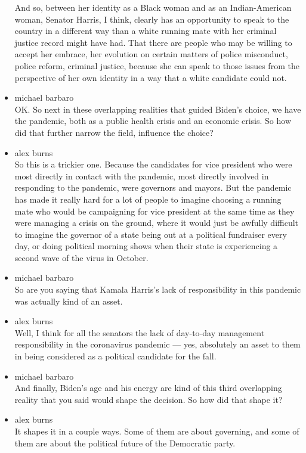 \begin{itemize}
  And so, between her identity as a Black woman and as an
  Indian-American woman, Senator Harris, I think, clearly has an
  opportunity to speak to the country in a different way than a white
  running mate with her criminal justice record might have had. That
  there are people who may be willing to accept her embrace, her
  evolution on certain matters of police misconduct, police reform,
  criminal justice, because she can speak to those issues from the
  perspective of her own identity in a way that a white candidate could
  not.
\item
  michael barbaro\\
  OK. So next in these overlapping realities that guided Biden's choice,
  we have the pandemic, both as a public health crisis and an economic
  crisis. So how did that further narrow the field, influence the
  choice?
\item
  alex burns\\
  So this is a trickier one. Because the candidates for vice president
  who were most directly in contact with the pandemic, most directly
  involved in responding to the pandemic, were governors and mayors. But
  the pandemic has made it really hard for a lot of people to imagine
  choosing a running mate who would be campaigning for vice president at
  the same time as they were managing a crisis on the ground, where it
  would just be awfully difficult to imagine the governor of a state
  being out at a political fundraiser every day, or doing political
  morning shows when their state is experiencing a second wave of the
  virus in October.
\item
  michael barbaro\\
  So are you saying that Kamala Harris's lack of responsibility in this
  pandemic was actually kind of an asset.
\item
  alex burns\\
  Well, I think for all the senators the lack of day-to-day management
  responsibility in the coronavirus pandemic --- yes, absolutely an
  asset to them in being considered as a political candidate for the
  fall.
\item
  michael barbaro\\
  And finally, Biden's age and his energy are kind of this third
  overlapping reality that you said would shape the decision. So how did
  that shape it?
\item
  alex burns\\
  It shapes it in a couple ways. Some of them are about governing, and
  some of them are about the political future of the Democratic party.

\end{itemize}
